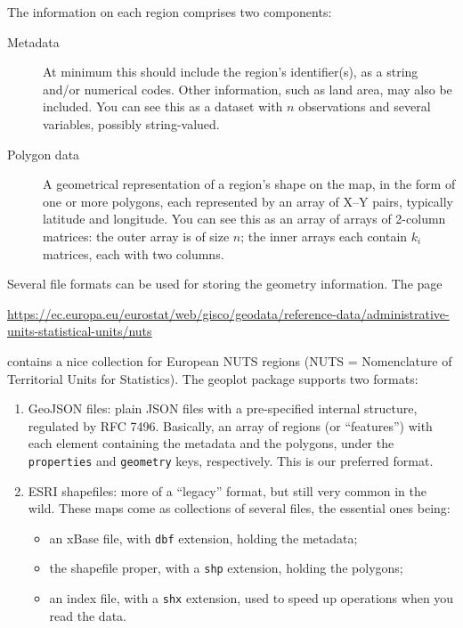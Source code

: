 \documentclass{article}
\begin{document}
The information on each region comprises two components:
\begin{description}
\item[Metadata] At minimum this should include the region's
  identifier(s), as a string and/or numerical codes. Other
  information, such as land area, may also be included. You can see
  this as a dataset with $n$ observations and several variables,
  possibly string-valued.
\item[Polygon data] A geometrical representation of a region's shape
  on the map, in the form of one or more polygons, each represented by
  an array of X--Y pairs, typically latitude and longitude. You can
  see this as an array of arrays of 2-column matrices: the outer array
  is of size $n$; the inner arrays each contain $k_i$ matrices, each
  with two columns.
\end{description}

Several file formats can be used for storing the geometry information.
The page

{\small
\url{https://ec.europa.eu/eurostat/web/gisco/geodata/reference-data/administrative-units-statistical-units/nuts}}

contains a nice collection for European NUTS regions (NUTS =
Nomenclature of Territorial Units for Statistics).  The
\textsf{geoplot} package supports two formats:
\begin{enumerate}
\item GeoJSON files: plain JSON files with a
  pre-specified internal structure, regulated by RFC 7496. Basically,
  an array of regions (or ``features'') with each element containing
  the metadata and the polygons, under the \texttt{properties} and
  \texttt{geometry} keys, respectively.  This is our preferred format.
\item ESRI shapefiles: more of a ``legacy'' format, but still very
  common in the wild. These maps come as collections of several files,
  the essential ones being:
  \begin{itemize}
  \item an xBase file, with \texttt{dbf} extension, holding the
    metadata;
  \item the shapefile proper, with a \texttt{shp} extension, holding the
    polygons;
  \item an index file, with a \texttt{shx} extension, used to speed up
    operations when you read the data.
  \end{itemize}
\end{enumerate}
\end{document}
